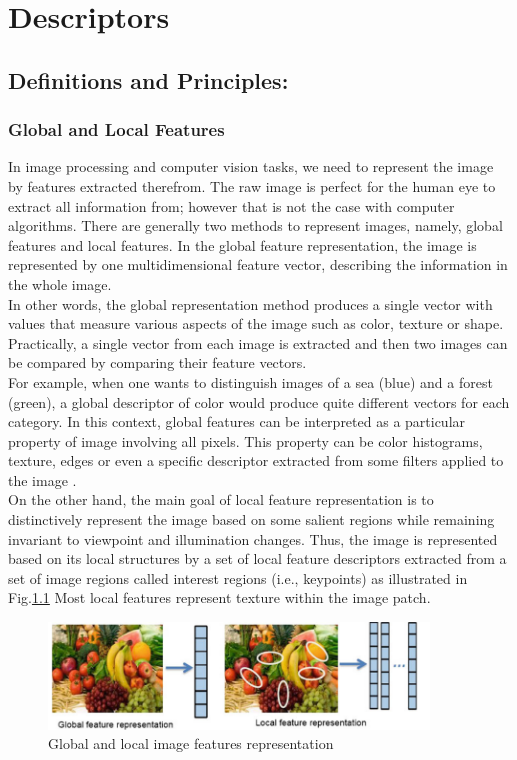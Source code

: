 
\chapter{Descriptors}

\section{Definitions and Principles:}

\subsection{Global and Local Features}
In image processing and computer vision tasks, we need to represent the image by
features extracted therefrom. The raw image is perfect for the human eye to extract
all information from; however that is not the case with computer algorithms. There
are generally two methods to represent images, namely, global features and local
features. In the global feature representation, the image is represented by one multidimensional
feature vector, describing the information in the whole image.\\
In other words, the global representation method produces a single vector with values that
measure various aspects of the image such as color, texture or shape. Practically, a
single vector from each image is extracted and then two images can be compared by
comparing their feature vectors.\\ For example, when one wants to distinguish images
of a sea (blue) and a forest (green), a global descriptor of color would produce quite
different vectors for each category. In this context, global features can be interpreted
as a particular property of image involving all pixels.
This property can be color
histograms, texture, edges or even a specific descriptor extracted from some filters
applied to the image \cite{h}.\\ On the other hand, the main goal of local feature representation
is to distinctively represent the image based on some salient regions while
remaining invariant to viewpoint and illumination changes. Thus, the image is represented
based on its local structures by a set of local feature descriptors extracted
from a set of image regions called interest regions (i.e., keypoints) as illustrated in
Fig.\ref{fig:Ft1} Most local features represent texture within the image patch.

\begin{figure}[H]
\centering
\includegraphics[width=0.9\textwidth]{img/features.PNG}
\caption{ Global and local image features representation }
\label{fig:Ft1}
\end{figure}

